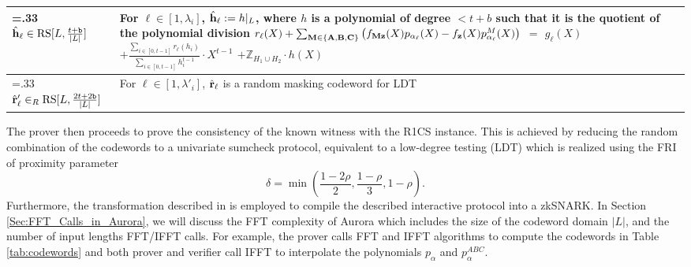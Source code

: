 \begin{table}[]
{\begin{tabularx}{\linewidth}{>{\hsize=.33\hsize}XX}
$\hat{{\bf{h}}}_\ell \in  \text{RS}[L, \frac{t+\texttt{b}}{|L|}]$ & For $\ell\in [1,\lambda_i]$,  $\hat{{\bf{h}}}_\ell := h|_L$, where $h$ is a polynomial of degree $<t+b$ such that it is the quotient of the polynomial division \newline
\(
r_\ell(X) + \sum_{\mathbf{M} \in \{\mathbf{A}, \mathbf{B}, \mathbf{C}\}} \left(f_{\mathbf{Mz}}(X)p_{\alpha_\ell}(X) - f_{\bf{z}}(X) p^{M}_{\alpha_\ell}(X)\right)
\) $=$ $g_\ell(X)$
$ + \frac{\sum_{i\in[0,t-1]}r_\ell(h_i)}{\sum_{i\in[0,t-1]}h_i^{t-1}}\cdot X^{t-1} $
$+ \mathbb{Z}_{H_1\cup H_2} \cdot h(X)$
\\
\midrule
$\hat{{\bf{r}}}'_\ell \in_R  \text{RS}[L, \frac{2t+2\texttt{b}}{|L|}]$ & For $\ell\in [1,\lambda'_i]$, $\hat{{\bf{r}}}_\ell$ is a random masking codeword for LDT
\\
\bottomrule
\end{tabularx}
}
\end{table}
The prover then proceeds to prove the consistency of the known witness with the R1CS instance. This is achieved by reducing the random combination of the codewords to a univariate sumcheck protocol, equivalent to a low-degree testing (LDT) which is realized using the FRI of proximity parameter 
\begin{equation}\label{eq:proximity_parameter}
\delta = \min\left( \frac{1-2\rho}{2}, \frac{1-\rho}{3}, 1-\rho \right).
\end{equation}
Furthermore, the transformation described in \cite{BCS2016} is employed to compile the described interactive protocol into a zkSNARK. In Section \ref{Sec:FFT_Calls_in_Aurora}, we will discuss the FFT complexity of Aurora which includes the size of the codeword domain $|L|$, and the number of input lengths FFT/IFFT calls. For example, the prover calls FFT and IFFT algorithms to compute the codewords in Table \ref{tab:codewords} and both prover and verifier call  IFFT  to interpolate the polynomials $p_\alpha$ and $p^{ABC}_\alpha$. 




